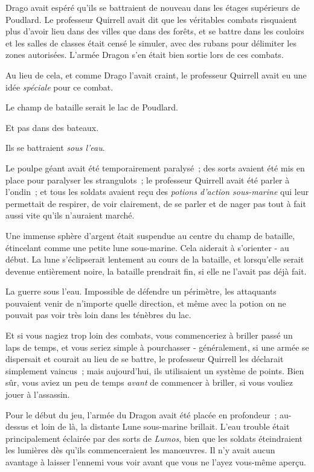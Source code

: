 \later

Drago avait espéré qu'ils se battraient de nouveau dans les étages supérieurs de Poudlard. Le professeur Quirrell avait dit que les véritables combats risquaient plus d'avoir lieu dans des villes que dans des forêts, et se battre dans les couloirs et les salles de classes était censé le simuler, avec des rubans pour délimiter les zones autorisées. L'armée Dragon s'en était bien sortie lors de ces combats.

Au lieu de cela, et comme Drago l'avait craint, le professeur Quirrell avait eu une idée \emph{spéciale} pour ce combat.

Le champ de bataille serait le lac de Poudlard.

Et pas dans des bateaux.

Ils se battraient \emph{sous l'eau}.

Le poulpe géant avait été temporairement paralysé~; des sorts avaient été mis en place pour paralyser les strangulots~; le professeur Quirrell avait été parler à l'ondin~; et tous les soldats avaient reçu des \emph{potions d'action sous-marine} qui leur permettait de respirer, de voir clairement, de se parler et de nager pas tout à fait aussi vite qu'ils n'auraient marché.

Une immense sphère d'argent était suspendue au centre du champ de bataille, étincelant comme une petite lune sous-marine. Cela aiderait à s'orienter - au début. La lune s'éclipserait lentement au cours de la bataille, et lorsqu'elle serait devenue entièrement noire, la bataille prendrait fin, si elle ne l'avait pas déjà fait.

La guerre sous l'eau. Impossible de défendre un périmètre, les attaquants pouvaient venir de n'importe quelle direction, et même avec la potion on ne pouvait pas voir très loin dans les ténèbres du lac.

Et si vous nagiez trop loin des combats, vous commenceriez à briller passé un laps de temps, et vous seriez simple à pourchasser - généralement, si une armée se dispersait et courait au lieu de se battre, le professeur Quirrell les déclarait simplement vaincus~; mais aujourd'hui, ils utilisaient un système de points. Bien sûr, vous aviez un peu de temps \emph{avant} de commencer à briller, si vous vouliez jouer à l'assassin.

Pour le début du jeu, l'armée du Dragon avait été placée en profondeur~; au-dessus et loin de là, la distante Lune sous-marine brillait. L'eau trouble était principalement éclairée par des sorts de \emph{Lumos}, bien que les soldats éteindraient les lumières dès qu'ils commenceraient les manœuvres. Il n'y avait aucun avantage à laisser l'ennemi vous voir avant que vous ne l'ayez vous-même aperçu.

